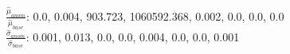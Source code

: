 $\frac{\hat\mu_{anom}}{\hat\mu_{base}}$: 0.0, 0.004, 903.723, 1060592.368, 0.002, 0.0, 0.0, 0.0\\$\frac{\hat\sigma_{anom}}{\hat\sigma_{base}}$: 0.001, 0.013, 0.0, 0.0, 0.004, 0.0, 0.0, 0.001
